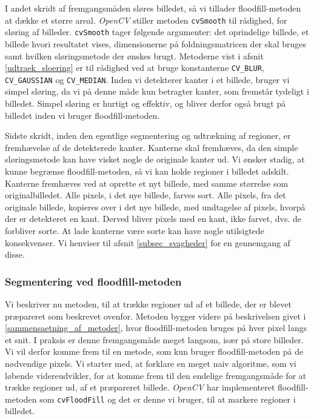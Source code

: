 {I andet skridt af fremgangsmåden sløres billedet, så vi tillader
floodfill-metoden at dække et større areal. \emph{OpenCV} stiller
metoden \texttt{cvSmooth} til rådighed, for sløring af billeder.
\texttt{cvSmooth} tager følgende argumenter: det oprindelige billede, et
billede hvori resultatet vises, dimensionerne på foldningsmatricen der
skal bruges samt hvilken sløringsmetode der ønskes brugt. Metoderne vist
i afsnit \ref{udtraek_sloering} er til rådighed ved at bruge
konstanterne \texttt{CV\_BLUR}, \texttt{CV\_GAUSSIAN} og
\texttt{CV\_MEDIAN}. Inden vi detekterer kanter i et billede, bruger vi
simpel sløring, da vi på denne måde kun betragter kanter, som fremstår
tydeligt i billedet.  Simpel sløring er hurtigt og effektiv, og bliver
derfor også brugt på billedet inden vi bruger floodfill-metoden.

Sidste skridt, inden den egentlige segmentering og udtrækning af
regioner, er fremhævelse af de detekterede kanter. Kanterne skal
fremhæves, da den simple sløringsmetode kan have visket nogle de
originale kanter ud.  Vi ønsker stadig, at kunne begrænse
floodfill-metoden, så vi kan holde regioner i billedet adskilt. Kanterne
fremhæves ved at oprette et nyt billede, med samme størrelse som
originalbilledet. Alle pixels, i det nye billede, farves sort. Alle
pixels, fra det originale billede, kopieres over i det nye billede, med
undtagelse af pixels, hvorpå der er detekteret en kant. Derved bliver
pixels med en kant, ikke farvet, dvs.  de forbliver sorte. At lade
kanterne være sorte kan have nogle utilsigtede konsekvenser. Vi henviser
til afsnit \ref{subsec_svagheder} for en gennemgang af disse.

\subsubsection{Segmentering ved floodfill-metoden}
Vi beskriver nu metoden, til at trække regioner ud af et billede, der er
blevet præpareret som beskrevet ovenfor. Metoden bygger videre på
beskrivelsen givet i \ref{sammensaetning_af_metoder}, hvor
floodfill-metoden bruges på hver pixel langs et snit. I praksis er denne
fremgangsmåde meget langsom, især på store billeder. Vi vil derfor komme
frem til en metode, som kun bruger floodfill-metoden på de nødvendige
pixels.  Vi starter med, at forklare en meget naiv algoritme, som vi
løbende videreudvikler, for at komme frem til den endelige fremgangsmåde
for at trække regioner ud, af et præpareret billede. \emph{OpenCV} har
implementeret floodfill-metoden som \texttt{cvFloodFill} og det er denne
vi bruger, til at markere regioner i billedet.

}
